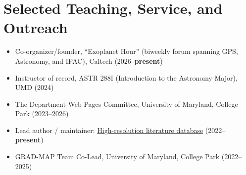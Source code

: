 \documentclass[letterpaper,11pt]{article}
\newcommand{\resumeItem}[2]{
  \item\small{
    \textbf{#1}{#2 \vspace{-2pt}}
  }
}
\newcommand{\resumeSubHeadingListStart}{\begin{itemize}[leftmargin=*]}
\newcommand{\resumeItemListStart}{\begin{itemize}}
\newcommand{\resumeItemListEnd}{\end{itemize}\vspace{-5pt}}
\newcommand{\shorterSection}[1]{\vspace{-10pt}\section{#1}}
\begin{document}
  





\shorterSection{Selected Teaching, Service, and Outreach}
\resumeItemListStart
\resumeItem{}{Co-organizer/founder, ``Exoplanet Hour'' (biweekly forum spanning GPS, Astronomy, and IPAC), Caltech (2026--\textbf{present})}
\resumeItem{}{Instructor of record, ASTR 288I (Introduction to the Astronomy Major), UMD (2024)}
\resumeItem{}{The Department Web Pages Committee, University of Maryland, College Park (2023--2026)}
\resumeItem{}{Lead author / maintainer: \href{https://www.arjunsavel.com/hires_papers.html}{High-resolution literature database} (2022--\textbf{present})}
\resumeItem{}{GRAD-MAP Team Co-Lead, University of Maryland, College Park (2022--2025)}
\resumeItemListEnd






\end{document}
